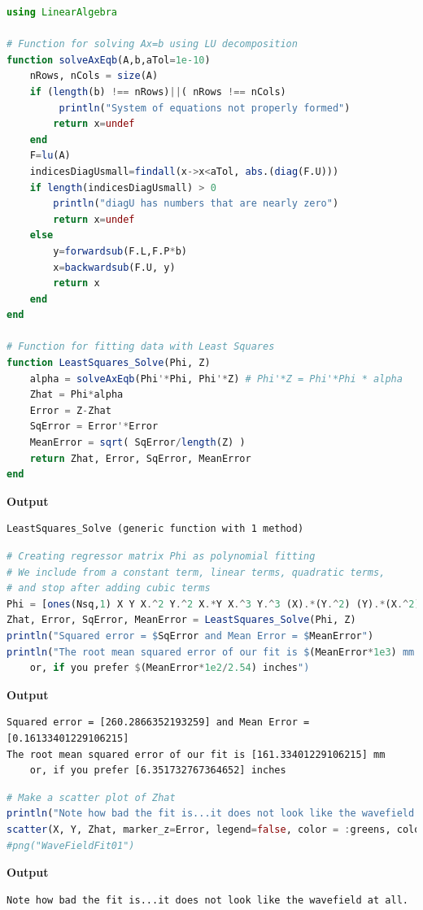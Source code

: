 \vspace*{.2cm}

\begin{lstlisting}[language=Julia,style=mystyle]
using LinearAlgebra

# Function for solving Ax=b using LU decomposition
function solveAxEqb(A,b,aTol=1e-10)
    nRows, nCols = size(A)
    if (length(b) !== nRows)||( nRows !== nCols)
         println("System of equations not properly formed")
        return x=undef
    end
    F=lu(A)
    indicesDiagUsmall=findall(x->x<aTol, abs.(diag(F.U)))
    if length(indicesDiagUsmall) > 0
        println("diagU has numbers that are nearly zero")
        return x=undef
    else
        y=forwardsub(F.L,F.P*b)
        x=backwardsub(F.U, y)
        return x 
    end
end

# Function for fitting data with Least Squares
function LeastSquares_Solve(Phi, Z)
    alpha = solveAxEqb(Phi'*Phi, Phi'*Z) # Phi'*Z = Phi'*Phi * alpha
    Zhat = Phi*alpha
    Error = Z-Zhat
    SqError = Error'*Error
    MeanError = sqrt( SqError/length(Z) )
    return Zhat, Error, SqError, MeanError
end
\end{lstlisting}
\textbf{Output} 
\begin{verbatim}
LeastSquares_Solve (generic function with 1 method)
\end{verbatim}

\begin{lstlisting}[language=Julia,style=mystyle]
# Creating regressor matrix Phi as polynomial fitting
# We include from a constant term, linear terms, quadratic terms, 
# and stop after adding cubic terms
Phi = [ones(Nsq,1) X Y X.^2 Y.^2 X.*Y X.^3 Y.^3 (X).*(Y.^2) (Y).*(X.^2)]
Zhat, Error, SqError, MeanError = LeastSquares_Solve(Phi, Z)
println("Squared error = $SqError and Mean Error = $MeanError")
println("The root mean squared error of our fit is $(MeanError*1e3) mm
    or, if you prefer $(MeanError*1e2/2.54) inches")
\end{lstlisting}
\textbf{Output} 
\begin{verbatim}
Squared error = [260.2866352193259] and Mean Error = [0.16133401229106215]
The root mean squared error of our fit is [161.33401229106215] mm
    or, if you prefer [6.351732767364652] inches
\end{verbatim}


\begin{lstlisting}[language=Julia,style=mystyle]
# Make a scatter plot of Zhat
println("Note how bad the fit is...it does not look like the wavefield at all.")
scatter(X, Y, Zhat, marker_z=Error, legend=false, color = :greens, colorbar=true, camera=(-60, 60))
#png("WaveFieldFit01")
\end{lstlisting}
\textbf{Output} 
\begin{verbatim}
Note how bad the fit is...it does not look like the wavefield at all.
\end{verbatim}

